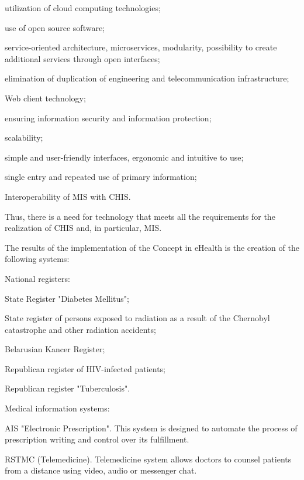 \documentclass[10pt, a4paper]{article}
\renewenvironment{itemize}{
    \begin{list}{\labelitemi}{
    \setlength{\topsep}{0pt}
    \setlength{\partopsep}{0pt}
    \setlength{\parskip}{0pt}
    \setlength{\itemsep}{0pt}
    \setlength{\parsep}{0pt}
    }
}{\end{list}}
\begin{document}
\begin{multicols}{2}
\begin{itemize}
    \item utilization of cloud computing technologies;
    \item use of open source software;
    \item service-oriented architecture, microservices, modularity, possibility to create additional services through open interfaces;
    \item elimination of duplication of engineering and telecommunication infrastructure;
    \item Web client technology;
    \item ensuring information security and information protection;
    \item scalability;
    \item simple and user-friendly interfaces, ergonomic and intuitive to use;
    \item single entry and repeated use of primary information;
    \item Interoperability of MIS with CHIS.
\end{itemize}
\par Thus, there is a need for technology that meets all
the requirements for the realization of CHIS and, in
particular, MIS.
\par The results of the implementation of the Concept in
eHealth is the creation of the following systems:
\begin{enumerate}
    \item National registers:
    \begin{itemize}
        \item State Register "Diabetes Mellitus";
        \item State register of persons exposed to radiation as a result of the Chernobyl catastrophe and other radiation accidents;
        \item Belarusian Kancer Register;
        \item Republican register of HIV-infected patients;
        \item Republican register "Tuberculosis".
    \end{itemize}
    \item Medical information systems:
    \begin{itemize}
        \item AIS "Electronic Prescription". This system is designed to automate the process of prescription writing and control over its fulfillment.
        \item RSTMC (Telemedicine). Telemedicine system allows doctors to counsel patients from a distance using video, audio or messenger chat.

\end{itemize}
\end{enumerate}
\end{multicols}
\end{document}
